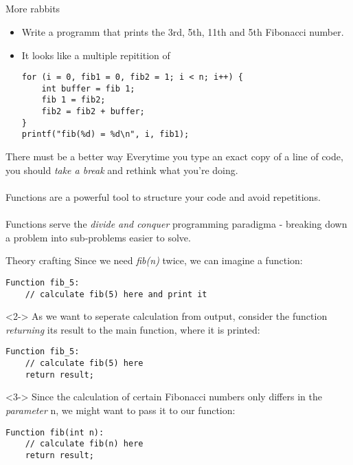 \subsection{}
\begin{frame}[fragile]{More rabbits}
	\begin{itemize}
		\item Write a programm that prints the 3rd, 5th, 11th and 5th Fibonacci number.
		\item<2-> It looks like a multiple repitition of
		\begin{lstlisting}
for (i = 0, fib1 = 0, fib2 = 1; i < n; i++) {
	int buffer = fib 1;
	fib 1 = fib2;
	fib2 = fib2 + buffer;
}
printf("fib(%d) = %d\n", i, fib1);
\end{lstlisting}
	\end{itemize}
\end{frame}
\begin{frame}{There must be a better way}
	Everytime you type an exact copy of a line of code, you should \textit{take a break} and rethink what you're doing. \\ \ \\
	Functions are a powerful tool to structure your code and avoid repetitions. \\ \ \\
	Functions serve the \textit{divide and conquer} programming paradigma - breaking down a problem into sub-problems easier to solve.
\end{frame}
\begin{frame}[fragile]{Theory crafting}
	Since we need \textit{fib(n)} twice, we can imagine a function:
	\begin{lstlisting}[numbers=none]
Function fib_5:
	// calculate fib(5) here and print it
\end{lstlisting}
	\begin{uncoverenv}<2->
	As we want to seperate calculation from output, consider the function \textit{returning} its result to the main function, where it is printed:
	\begin{lstlisting}[numbers=none]
Function fib_5:
	// calculate fib(5) here
	return result;
\end{lstlisting}
	\end{uncoverenv}
	\begin{uncoverenv}<3->
	Since the calculation of certain Fibonacci numbers only differs in the \textit{parameter} n, we might want to pass it to our function:
	\begin{lstlisting}[numbers=none]
Function fib(int n):
	// calculate fib(n) here
	return result;
\end{lstlisting}
	\end{uncoverenv}
\end{frame}
